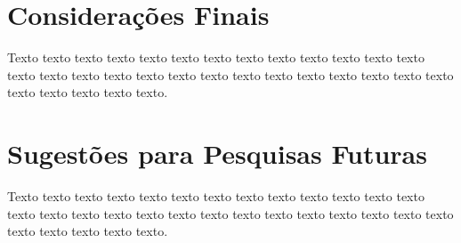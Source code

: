 
\section{Considerações Finais} 

Texto texto texto texto texto texto texto texto texto texto texto texto texto
texto texto texto texto texto texto texto texto texto texto texto texto texto
texto texto texto texto texto texto. 

\section{Sugestões para Pesquisas Futuras} 

Texto texto texto texto texto texto texto texto texto texto texto texto texto
texto texto texto texto texto texto texto texto texto texto texto texto texto
texto texto texto texto texto texto.

